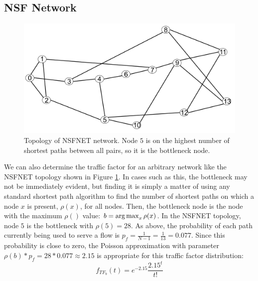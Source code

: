 
{\color{blue}
\subsection{NSF Network}

\begin{figure}
\begin{centering}
    \includegraphics[scale=0.25]{figures/NSF_net.png}
    \caption{{\color{blue}Topology of NSFNET network. Node $5$ is on the highest number of shortest paths between all pairs, so it is the bottleneck node.}}
    \label{fig:NSF_net}
\end{centering}
\end{figure}

We can also determine the traffic factor for an arbitrary network like the NSFNET topology \cite{nsf_net} shown in Figure \ref{fig:NSF_net}. In cases such as this, the bottleneck may not be immediately evident, but finding it is simply a matter of using any standard shortest path algorithm to find the number of shortest paths on which a node $x$ is present, $\rho(x)$, for all nodes. Then, the bottleneck node is the node with the maximum $\rho()$ value: $b = \operatorname*{arg\,max}_{x} \rho(x)$. In the NSFNET topology, node $5$ is the bottleneck with $\rho(5) = 28$. As above, the probability of each path currently being used to serve a flow is $p_f = \frac{1}{N-1} = \frac{1}{13} = 0.077$. Since this probability is close to zero, the Poisson approximation with parameter $\rho(b)*p_f = 28*0.077 \approx 2.15$ is appropriate for this traffic factor distribution:
\begin{equation*}
  f_{TF_b}(t) = e^{-2.15} \frac{2.15^t}{t!}
\end{equation*}
}

